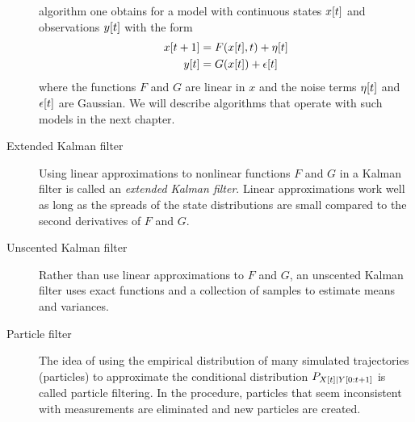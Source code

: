 \begin{description}
  algorithm one obtains for a model with continuous states ${x}{[t]}$
  and observations ${y}{[t]}$ with the form
  \begin{align*}
    {x}{[t+1]} &= F({x}{[t]},t) + {\eta}{[t]}\\
    {y}{[t]} &= G({x}{[t]}) + {\epsilon}{[t]}
  \end{align*}
  where the functions $F$ and $G$ are linear in $x$ and the noise
  terms ${\eta}{[t]}$ and ${\epsilon}{[t]}$ are Gaussian.  We will
  describe algorithms that operate with such models in the next
  chapter.
\item[Extended Kalman filter] Using linear approximations to nonlinear
  functions $F$ and $G$ in a Kalman filter is called an \emph{extended
    Kalman filter}.  Linear approximations work well as long as the
  spreads of the state distributions are small compared to the second
  derivatives of $F$ and $G$.
\item[Unscented Kalman filter] Rather than use linear approximations
  to $F$ and $G$, an unscented Kalman filter\cite{Julier97} uses exact
  functions and a collection of samples to estimate means and
  variances.
\item[Particle filter] The idea of using the empirical distribution of
  many simulated trajectories (particles) to approximate the
  conditional distribution $P_{{X}{[t]}\mid Y[0:t+1]}$ is called
  particle filtering\cite{Gordon93,Kitagawa96}.  In the procedure,
  particles that seem inconsistent with measurements are eliminated
  and new particles are created. 
\end{description}

